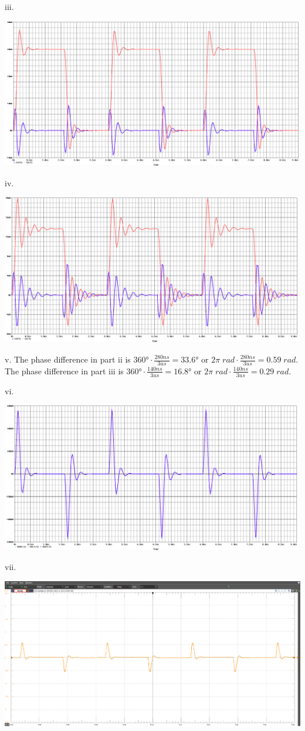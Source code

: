 \documentclass[12pt]{article}
\begin{document}
iii.
\begin{center}
    \includegraphics[width=\textwidth]{q3.PNG}
\end{center}
\restoregeometry
\clearpage
iv.
\begin{center}
    \includegraphics[width=\textwidth]{q4.PNG}
\end{center}
v. The phase difference in part ii is $\ang{360}\cdot\frac{280ns}{3us} = \ang{33.6}$ or $2\pi\; rad\cdot\frac{280ns}{3us} = 0.59\; rad$. The phase difference in part iii is $\ang{360}\cdot\frac{140ns}{3us} = \ang{16.8}$ or $2\pi\; rad\cdot\frac{140ns}{3us} = 0.29\; rad$.

vi.
\begin{center}
    \includegraphics[width=\textwidth]{q6.PNG}
\end{center}
\clearpage
vii.
\begin{center}
    \includegraphics[width=\textwidth]{q7.PNG}
\end{center}
\end{document}
